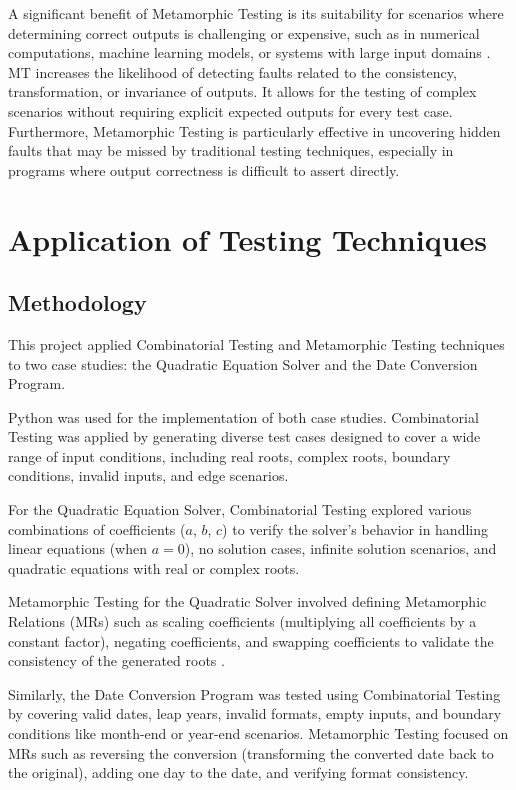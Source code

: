 \documentclass[conference]{IEEEtran}
\begin{document}
A significant benefit of Metamorphic Testing is its suitability for scenarios where determining correct outputs is challenging or expensive, such as in numerical computations, machine learning models, or systems with large input domains \cite{b7}. MT increases the likelihood of detecting faults related to the consistency, transformation, or invariance of outputs. It allows for the testing of complex scenarios without requiring explicit expected outputs for every test case. Furthermore, Metamorphic Testing is particularly effective in uncovering hidden faults that may be missed by traditional testing techniques, especially in programs where output correctness is difficult to assert directly.

\section{Application of Testing Techniques}
\subsection{Methodology}
This project applied Combinatorial Testing and Metamorphic Testing techniques to two case studies: the Quadratic Equation Solver and the Date Conversion Program.

Python was used for the implementation of both case studies. Combinatorial Testing was applied by generating diverse test cases designed to cover a wide range of input conditions, including real roots, complex roots, boundary conditions, invalid inputs, and edge scenarios.

For the Quadratic Equation Solver, Combinatorial Testing explored various combinations of coefficients ($a$, $b$, $c$) to verify the solver's behavior in handling linear equations (when $a=0$), no solution cases, infinite solution scenarios, and quadratic equations with real or complex roots. 

Metamorphic Testing for the Quadratic Solver involved defining Metamorphic Relations (MRs) such as scaling coefficients (multiplying all coefficients by a constant factor), negating coefficients, and swapping coefficients to validate the consistency of the generated roots \cite{b3}.

Similarly, the Date Conversion Program was tested using Combinatorial Testing by covering valid dates, leap years, invalid formats, empty inputs, and boundary conditions like month-end or year-end scenarios. Metamorphic Testing focused on MRs such as reversing the conversion (transforming the converted date back to the original), adding one day to the date, and verifying format consistency.
\end{document}
